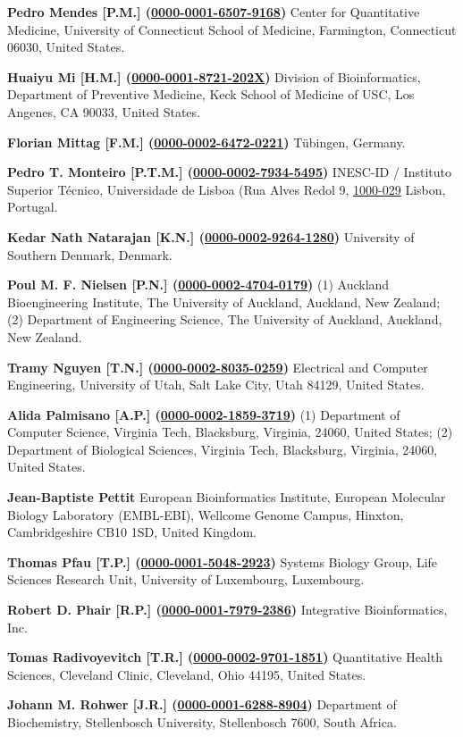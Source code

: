 \documentclass{sbml-paper}
\newcommand{\orcid}[1]{\href{https://orcid.org/#1}{#1}}
\begin{document}
\textbf{Pedro Mendes [P.M.] (\orcid{0000-0001-6507-9168})} Center for Quantitative Medicine, University of Connecticut School of Medicine, Farmington, Connecticut 06030, United States.

\textbf{Huaiyu Mi [H.M.] (\orcid{0000-0001-8721-202X})} Division of Bioinformatics, Department of Preventive Medicine, Keck School of Medicine of USC, Los Angenes, CA 90033, United States.

\textbf{Florian Mittag [F.M.] (\orcid{0000-0002-6472-0221})} Tübingen, Germany.

\textbf{Pedro T. Monteiro [P.T.M.] (\orcid{0000-0002-7934-5495})} INESC-ID / Instituto Superior Técnico, Universidade de Lisboa (Rua Alves Redol 9, \orcid{1000-029} Lisbon, Portugal.

\textbf{Kedar Nath Natarajan [K.N.] (\orcid{0000-0002-9264-1280})} University of Southern Denmark, Denmark.

\textbf{Poul M. F. Nielsen [P.N.] (\orcid{0000-0002-4704-0179})} (1) Auckland Bioengineering Institute, The University of Auckland, Auckland, New Zealand; (2) Department of Engineering Science, The University of Auckland, Auckland, New Zealand.

\textbf{Tramy Nguyen [T.N.] (\orcid{0000-0002-8035-0259})} Electrical and Computer Engineering, University of Utah, Salt Lake City, Utah 84129, United States.

\textbf{Alida Palmisano [A.P.] (\orcid{0000-0002-1859-3719})} (1) Department of Computer Science, Virginia Tech, Blacksburg, Virginia, 24060,  United States; (2) Department of Biological Sciences, Virginia Tech, Blacksburg, Virginia, 24060, United States.

\textbf{Jean-Baptiste Pettit} European Bioinformatics Institute, European Molecular Biology Laboratory (EMBL-EBI), Wellcome Genome Campus, Hinxton, Cambridgeshire CB10 1SD, United Kingdom.

\textbf{Thomas Pfau [T.P.] (\orcid{0000-0001-5048-2923})} Systems Biology Group, Life Sciences Research Unit, University of Luxembourg, Luxembourg.

\textbf{Robert D. Phair [R.P.] (\orcid{0000-0001-7979-2386})} Integrative Bioinformatics, Inc.

\textbf{Tomas Radivoyevitch [T.R.] (\orcid{0000-0002-9701-1851})} Quantitative Health Sciences, Cleveland Clinic, Cleveland, Ohio 44195, United States.

\textbf{Johann M. Rohwer [J.R.] (\orcid{0000-0001-6288-8904})} Department of Biochemistry, Stellenbosch University, Stellenbosch 7600, South Africa.
\end{document}
